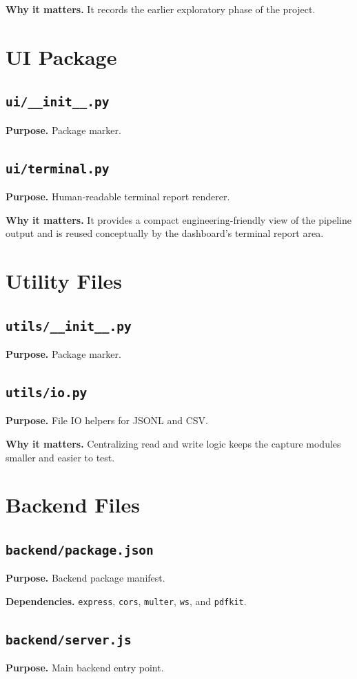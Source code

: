 \documentclass[12pt,a4paper]{report}
\begin{document}
\textbf{Why it matters.} It records the earlier exploratory phase of the project.

\chapter{UI Package}
\section{\texttt{ui/\_\_init\_\_.py}}
\textbf{Purpose.} Package marker.

\section{\texttt{ui/terminal.py}}
\textbf{Purpose.} Human-readable terminal report renderer.

\textbf{Why it matters.} It provides a compact engineering-friendly view of the pipeline output and is reused conceptually by the dashboard’s terminal report area.

\chapter{Utility Files}
\section{\texttt{utils/\_\_init\_\_.py}}
\textbf{Purpose.} Package marker.

\section{\texttt{utils/io.py}}
\textbf{Purpose.} File IO helpers for JSONL and CSV.

\textbf{Why it matters.} Centralizing read and write logic keeps the capture modules smaller and easier to test.

\chapter{Backend Files}
\section{\texttt{backend/package.json}}
\textbf{Purpose.} Backend package manifest.

\textbf{Dependencies.} \texttt{express}, \texttt{cors}, \texttt{multer}, \texttt{ws}, and \texttt{pdfkit}.

\section{\texttt{backend/server.js}}
\textbf{Purpose.} Main backend entry point.
\end{document}
